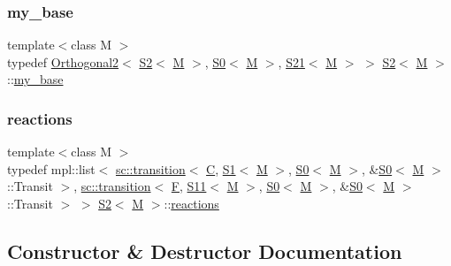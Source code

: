 \subsubsection{\texorpdfstring{my\+\_\+base}{my\_base}}
{\footnotesize\ttfamily template$<$class M $>$ \\
typedef \mbox{\hyperlink{struct_orthogonal2}{Orthogonal2}}$<$ \mbox{\hyperlink{struct_s2}{S2}}$<$ \mbox{\hyperlink{struct_m}{M}} $>$, \mbox{\hyperlink{struct_s0}{S0}}$<$ \mbox{\hyperlink{struct_m}{M}} $>$, \mbox{\hyperlink{struct_s21}{S21}}$<$ \mbox{\hyperlink{struct_m}{M}} $>$ $>$ \mbox{\hyperlink{struct_s2}{S2}}$<$ \mbox{\hyperlink{struct_m}{M}} $>$\+::\mbox{\hyperlink{struct_s2_a37188d65c88846ab9ffe243fda7ddc5b}{my\+\_\+base}}}

\mbox{\label{struct_s2_af56cfc6a349522edebd2e00aa3790d03}} 
\subsubsection{\texorpdfstring{reactions}{reactions}}
{\footnotesize\ttfamily template$<$class M $>$ \\
typedef mpl\+::list$<$ \mbox{\hyperlink{classboost_1_1statechart_1_1transition}{sc\+::transition}}$<$ \mbox{\hyperlink{struct_c}{C}}, \mbox{\hyperlink{struct_s1}{S1}}$<$ \mbox{\hyperlink{struct_m}{M}} $>$, \mbox{\hyperlink{struct_s0}{S0}}$<$ \mbox{\hyperlink{struct_m}{M}} $>$, \&\mbox{\hyperlink{struct_s0}{S0}}$<$ \mbox{\hyperlink{struct_m}{M}} $>$\+::Transit $>$, \mbox{\hyperlink{classboost_1_1statechart_1_1transition}{sc\+::transition}}$<$ \mbox{\hyperlink{struct_f}{F}}, \mbox{\hyperlink{struct_s11}{S11}}$<$ \mbox{\hyperlink{struct_m}{M}} $>$, \mbox{\hyperlink{struct_s0}{S0}}$<$ \mbox{\hyperlink{struct_m}{M}} $>$, \&\mbox{\hyperlink{struct_s0}{S0}}$<$ \mbox{\hyperlink{struct_m}{M}} $>$\+::Transit $>$ $>$ \mbox{\hyperlink{struct_s2}{S2}}$<$ \mbox{\hyperlink{struct_m}{M}} $>$\+::\mbox{\hyperlink{struct_s2_af56cfc6a349522edebd2e00aa3790d03}{reactions}}}



\subsection{Constructor \& Destructor Documentation}
\mbox{\label{struct_s2_a086237c4e2491ccf22ebc9120c50df53}} 
